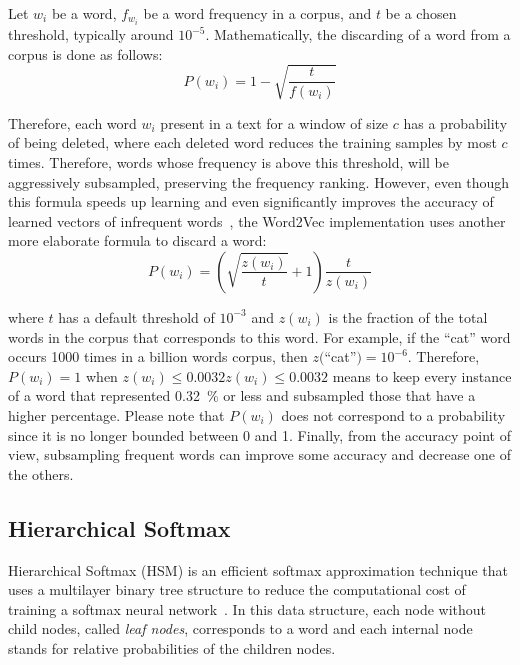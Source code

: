 Let $w_i$ be a word, $f_{w_i}$ be a word frequency in a corpus, and $t$ be a
chosen threshold, typically around $10^{-5}$. Mathematically, the discarding of
a word from a corpus is done as follows:
\begin{equation}
  P(w_i) = 1 - \sqrt{\frac{t}{f(w_i)}}
  \label{eq:w2v:sfw}
\end{equation}

Therefore, each word $w_i$ present in a text for a window of size $c$ has a
probability of being deleted, where each deleted word reduces the training
samples by most $c$ times. Therefore, words whose frequency is above this
threshold, will be aggressively subsampled, preserving the frequency
ranking. However, even though this formula speeds up learning and even
significantly improves the accuracy of learned vectors of infrequent
words~\citep{inproceedings:mikolov}, the Word2Vec implementation uses another
more elaborate formula to discard a word:
\begin{equation}
  P(w_i) = \left(\sqrt{\frac{z(w_i)}{t}} + 1\right)\frac{t}{z(w_i)}
  \label{eq:w2v:sfw:real}
\end{equation}

where $t$ has a default threshold of $10^{-3}$ and $z(w_i)$ is the fraction of
the total words in the corpus that corresponds to this word. For example, if the
``cat'' word occurs 1000 times in a billion words corpus, then $z($``cat''$) =
10^{-6}$. Therefore, $P(w_i) = 1$ when $z(w_i) \leq 0.0032z(w_i) \leq 0.0032$
means to keep every instance of a word that represented \SI{0.32}{\percent} or
less and subsampled those that have a higher percentage. Please note that
$P(w_i)$ does not correspond to a probability since it is no longer bounded
between 0 and 1. Finally, from the accuracy point of view, subsampling frequent
words can improve some accuracy and decrease one of the others.

\subsection{Hierarchical Softmax}
\label{subsec:w2v:hsm}

Hierarchical Softmax (HSM) is an efficient softmax approximation technique that
uses a multilayer binary tree structure to reduce the computational cost of
training a softmax neural network~\citep{DBLP:conf/aistats/MorinB05}. In this
data structure, each node without child nodes, called \emph{leaf nodes},
corresponds to a word and each internal node stands for relative probabilities
of the children nodes.

